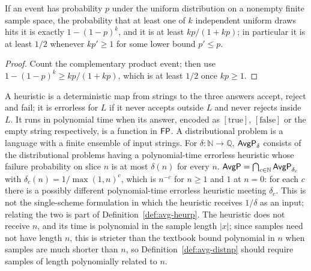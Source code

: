 \begin{lemma}
  \label{lem:avg-repetition}
  \leanok
  If an event has probability $p$ under the uniform distribution on a nonempty
  finite sample space, the probability that at least one of $k$ independent
  uniform draws hits it is exactly $1 - (1-p)^k$, and it is at least
  $kp/(1+kp)$; in particular it is at least $1/2$ whenever $kp' \ge 1$ for
  some lower bound $p' \le p$.
\end{lemma}
\begin{proof}
  \leanok
  Count the complementary product event; then use $1 - (1-p)^k \ge kp/(1+kp)$,
  which is at least $1/2$ once $kp \ge 1$.
\end{proof}

\begin{definition}
  \label{def:avg-avgp}
  \leanok
  A heuristic is a deterministic map from strings to the three answers accept,
  reject and fail; it is errorless for $L$ if it never accepts outside $L$ and
  never rejects inside $L$. It runs in polynomial time when its answer, encoded
  as $[\mathrm{true}]$, $[\mathrm{false}]$ or the empty string respectively, is
  a function in $\mathsf{FP}$. A distributional problem is a language with a finite
  ensemble of input strings. For $\delta \colon \mathbb{N} \to \mathbb{Q}$,
  $\mathsf{AvgP}_\delta$ consists of the distributional problems having a
  polynomial-time errorless heuristic whose failure probability on slice $n$ is
  at most $\delta(n)$ for every $n$. $\mathsf{AvgP} = \bigcap_{c \in \mathbb{N}}
  \mathsf{AvgP}_{\delta_c}$ with $\delta_c(n) = 1/\max(1,n)^c$, which is $n^{-c}$
  for $n \ge 1$ and $1$ at $n = 0$: for each $c$ there is a possibly different
  polynomial-time errorless heuristic meeting $\delta_c$. This is not the
  single-scheme formulation in which the heuristic receives $1/\delta$ as an
  input; relating the two is part of Definition~\ref{def:avg-heurp}. The
  heuristic does not receive $n$, and its time is polynomial in the sample
  length $|x|$; since samples need not have length $n$, this is stricter than
  the textbook bound polynomial in $n$ when samples are much shorter than $n$,
  so Definition~\ref{def:avg-distnp} should require samples of length
  polynomially related to $n$.
\end{definition}

